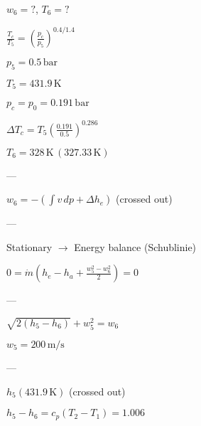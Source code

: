 \( w_6 = ? \), \( T_6 = ? \)

\( \frac{T_c}{T_5} = \left( \frac{p_c}{p_5} \right)^{0.4 / 1.4} \)

\( p_5 = 0.5 \, \text{bar} \)

\( T_5 = 431.9 \, \text{K} \)

\( p_c = p_0 = 0.191 \, \text{bar} \)

\( \Delta T_c = T_5 \left( \frac{0.191}{0.5} \right)^{0.286} \)

\( T_6 = 328 \, \text{K} \, (327.33 \, \text{K}) \)

---

\( w_6 = - \left( \int v \, dp + \Delta h_e \right) \) (crossed out)

---

Stationary \( \rightarrow \) Energy balance (Schublinie)

\( 0 = \dot{m} \left( h_e - h_a + \frac{w_5^2 - w_6^2}{2} \right) = 0 \)

---

\( \sqrt{2 (h_5 - h_6)} + w_5^2 = w_6 \)

\( w_5 = 200 \, \text{m/s} \)

---

\( h_5 (431.9 \, \text{K}) \) (crossed out)

\( h_5 - h_6 = c_p \left( T_2 - T_1 \right) = 1.006 \)